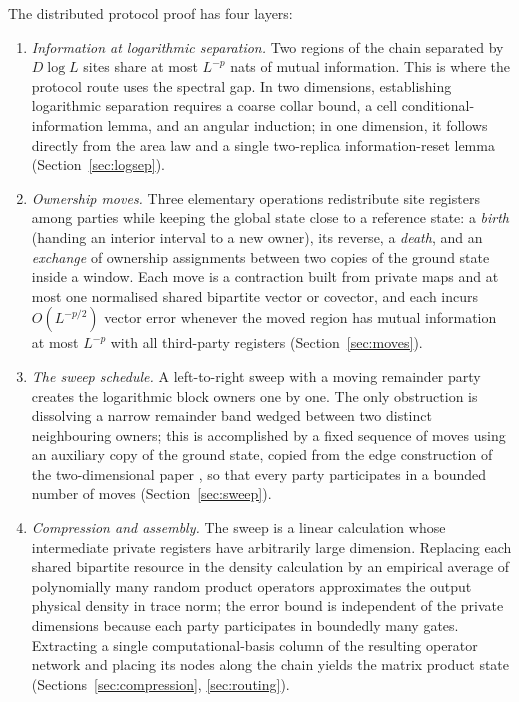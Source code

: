 \begin{inwords}
The distributed protocol proof has four layers:
\begin{enumerate}[leftmargin=2em]
\item \emph{Information at logarithmic separation.} Two regions of the
chain separated by $D\log L$ sites share at most $L^{-p}$ nats of mutual
information. This is where the protocol route uses the
spectral gap. In two dimensions, establishing logarithmic
separation requires a coarse collar bound, a cell conditional-information
lemma, and an angular induction; in one dimension, it follows directly from
the area law and a single two-replica information-reset lemma
(Section~\ref{sec:logsep}).
\item \emph{Ownership moves.} Three elementary operations redistribute site
registers among parties while keeping the global state close to a reference
state: a \emph{birth} (handing an interior interval to a new owner), its
reverse, a \emph{death}, and an \emph{exchange} of ownership assignments
between two copies of the ground state inside a window. Each move is a
contraction built from private maps and at most one normalised shared
bipartite vector or covector, and each incurs $O(L^{-p/2})$ vector error
whenever the moved region has mutual information at most $L^{-p}$ with all
third-party registers (Section~\ref{sec:moves}).
\item \emph{The sweep schedule.} A left-to-right sweep with a moving
remainder party creates the logarithmic block owners one by one. The only
obstruction is dissolving a narrow remainder band wedged between two
distinct neighbouring owners; this is accomplished by a fixed sequence of
moves using an auxiliary copy of the ground state, copied from the edge
construction of the two-dimensional paper \cite{PP}, so that every party
participates in a bounded number of moves (Section~\ref{sec:sweep}).
\item \emph{Compression and assembly.} The sweep is a linear calculation
whose intermediate private registers have arbitrarily large dimension.
Replacing each shared bipartite resource in the density calculation by an
empirical average of polynomially many random product operators approximates
the output physical density in trace norm; the error bound is independent
of the private dimensions because each party participates in boundedly many
gates. Extracting a single computational-basis column of the resulting
operator network and placing its nodes along the chain yields the matrix
product state (Sections~\ref{sec:compression}, \ref{sec:routing}).
\end{enumerate}
\end{inwords}

